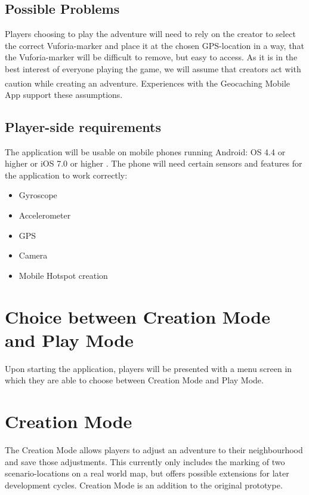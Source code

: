 \documentclass{sigchi-ext}
\begin{document}
\subsection{Possible Problems}

Players choosing to play the adventure will need to rely on the creator to select the correct Vuforia-marker and place it at the chosen GPS-location in a way, that the Vuforia-marker will be difficult to remove, but easy to access. As it is in the best interest of everyone playing the game, we will assume that creators act with caution while creating an adventure. Experiences with the Geocaching\textsuperscript{\textregistered} Mobile App \cite{app:geocaching} support these assumptions.

\subsection{Player-side requirements}

The application will be usable on mobile phones running Android: OS 4.4 or higher or iOS 7.0 or higher \cite{unityRequirements}. The phone will need certain sensors and features for the application to work correctly:

\begin{itemize}\compresslist%
	\item Gyroscope
	\item Accelerometer
	\item GPS
	\item Camera
	\item Mobile Hotspot creation \cite{desc:hotspot}
\end{itemize}

\section{Choice between Creation Mode and Play Mode}

Upon starting the application, players will be presented with a menu screen in which they are able to choose between Creation Mode and Play Mode.


\section{Creation Mode} 
\label{sec:Creation}

The Creation Mode allows players to adjust an adventure to their neighbourhood and save those adjustments. This currently only includes the marking of two scenario-locations on a real world map, but offers possible extensions for later development cycles. Creation Mode is an addition to the original prototype.
\end{document}
